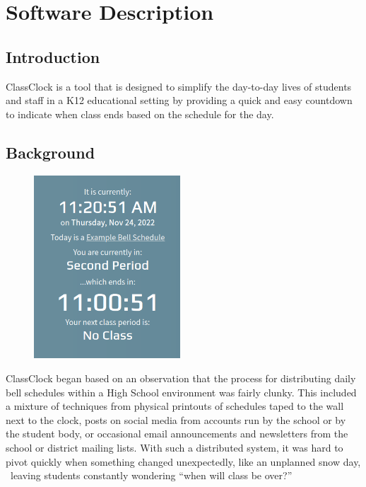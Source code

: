 \documentclass{article}
\begin{document}
\bigskip


\bigskip


\bigskip


\bigskip

\clearpage
\bigskip

\section{Software Description}
\subsection{Introduction}
{ClassClock is a tool that is designed to simplify the day-to-day lives of students and staff in a K12 educational
setting by providing a quick and easy countdown to indicate when class ends based on the schedule for the day.}

\subsection{Background}
\begin{figure}
\includegraphics[width=2.1575in,height=2.6972in]{Mini20Manual-img002.png}\end{figure}
{ClassClock began based on an observation that the process for distributing daily bell schedules within a High School
environment was fairly clunky. This included a mixture of techniques from physical printouts of schedules taped to the
wall next to the clock, posts on social media from accounts run by the school or by the student body, or occasional
email announcements and newsletters from the school or district mailing lists. With such a distributed system, it was
hard to pivot quickly when something changed unexpectedly, like an unplanned snow day, \ leaving students constantly
wondering “when will class be over?”}
\end{document}
